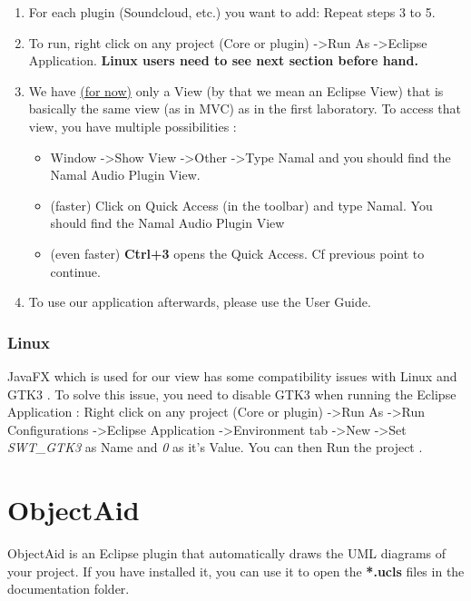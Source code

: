 \documentclass{report}
\begin{document}
{\begin{enumerate}
\item For each plugin (Soundcloud, etc.) you want to add: Repeat steps 3 to 5.
\item To run, right click on any project (Core or plugin) -\textgreater Run As -\textgreater Eclipse Application. \textbf{Linux users need to see next section before hand.}
\item We have \hyperref[lim::toolbar]{(for now)} only a View (by that we mean an Eclipse View) that is basically the same view (as in MVC) as in the first laboratory. To access that view, you have multiple possibilities :
\begin{itemize}
\item Window -\textgreater Show View -\textgreater Other -\textgreater Type Namal and you should find the Namal Audio Plugin View.
\item (faster) Click on Quick Access (in the toolbar) and type Namal. You should find the Namal Audio Plugin View
\item (even faster) \textbf{Ctrl+3} opens the Quick Access. Cf previous point to continue.
\end{itemize}
\item To use our application afterwards, please use the User Guide.
\end{enumerate}

\subsubsection{Linux}
JavaFX which is used for our view has some compatibility issues with Linux and GTK3 . To solve this issue, you need to disable GTK3 when running the Eclipse Application : Right click on any project (Core or plugin) -\textgreater Run As -\textgreater Run Configurations -\textgreater Eclipse Application -\textgreater Environment tab -\textgreater New -\textgreater Set \textit{SWT\_GTK3} as Name and \textit{0} as it's Value. You can then Run the project .
}

\section{ObjectAid}
ObjectAid is an Eclipse plugin that automatically draws the UML diagrams of your project. If you have installed it, you can use it to open the \textbf{*.ucls} files in the documentation folder.
\end{document}

